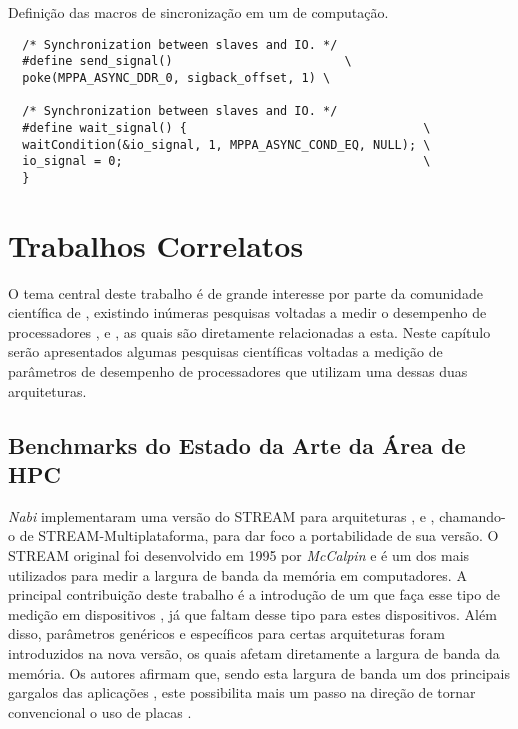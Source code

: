 \begin{listing}[tb]
\caption{Definição das macros de sincronização em um \cluster de computação.}
\label{lst:macrossynccc}
\begin{verbatim}
  /* Synchronization between slaves and IO. */
  #define send_signal()                        \
  poke(MPPA_ASYNC_DDR_0, sigback_offset, 1) \

  /* Synchronization between slaves and IO. */
  #define wait_signal() {                                 \
  waitCondition(&io_signal, 1, MPPA_ASYNC_COND_EQ, NULL); \
  io_signal = 0;                                          \
  }     
\end{verbatim}
\fonte{o autor.}
\end{listing}

\chapter{Trabalhos Correlatos}
\label{ch:trabcorrelatos}

O tema central deste trabalho é de grande interesse por parte da comunidade científica de \HPC, existindo inúmeras pesquisas voltadas a medir o desempenho de processadores \multicore, \manycore e \chips \FPGA, as quais são diretamente relacionadas a esta. Neste capítulo serão apresentados algumas pesquisas científicas voltadas a medição de parâmetros de desempenho de processadores que utilizam uma dessas duas arquiteturas.

\section{Benchmarks do Estado da Arte da Área de HPC}
\label{sec:benchprahpc}

\textit{Nabi} \etal \cite{nabifpgabenchmark} implementaram uma versão do \bench STREAM para arquiteturas \FPGA, \GPUs e \CPUs, chamando-o de STREAM-Multiplataforma, para dar foco a portabilidade de sua versão. O \bench STREAM original foi desenvolvido em 1995 por \textit{McCalpin} \etal \cite{mccalpinstreambench} e é um dos \benchs mais utilizados para medir a largura de banda da memória em computadores. A principal contribuição deste trabalho é a introdução de um \bench que faça esse tipo de medição em dispositivos \FPGA, já que faltam \benchs desse tipo para estes dispositivos. Além disso, parâmetros genéricos e específicos para certas arquiteturas foram introduzidos na nova versão, os quais afetam diretamente a largura de banda da memória. Os autores afirmam que, sendo esta largura de banda um dos principais gargalos das aplicações \HPC \cite{asanoviclandscapeparallel}, este \bench possibilita mais um passo na direção de tornar convencional o uso de placas \FPGA.

